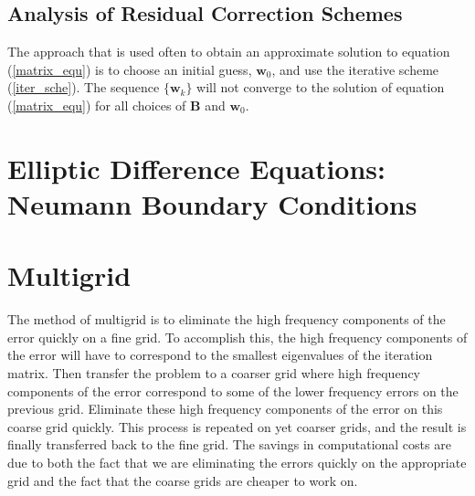 \documentclass[12pt,a4paper]{article}
\renewcommand{\vec}[1]{\boldsymbol{#1}}
\begin{document}
\subsection{Analysis of Residual Correction Schemes}
The approach that is used often to obtain an approximate solution to equation (\ref{matrix_equ}) is to choose an initial guess, $\vec{w}_0$, and use the iterative scheme (\ref{iter_sche}). The sequence $\{\vec{w}_k\}$ will not converge to the solution of equation (\ref{matrix_equ}) for all choices of $\vec{B}$ and $\vec{w}_0$.






\section{Elliptic Difference Equations: Neumann Boundary Conditions}







\section{Multigrid}
The method of multigrid is to eliminate the high frequency components of the error quickly on a fine grid. To accomplish this, the high frequency components of the error will have to correspond to the smallest eigenvalues of the iteration matrix. Then transfer the problem to a coarser grid where high frequency components of the error correspond to some of the lower frequency errors on the previous grid. Eliminate these high frequency components of the error on this coarse grid quickly. This process is repeated on yet coarser grids, and the result is finally transferred back to the fine grid. The savings in computational costs are due to both the fact that we are eliminating the errors quickly on the appropriate grid and the fact that the coarse grids are cheaper to work on.


















\end{document}
